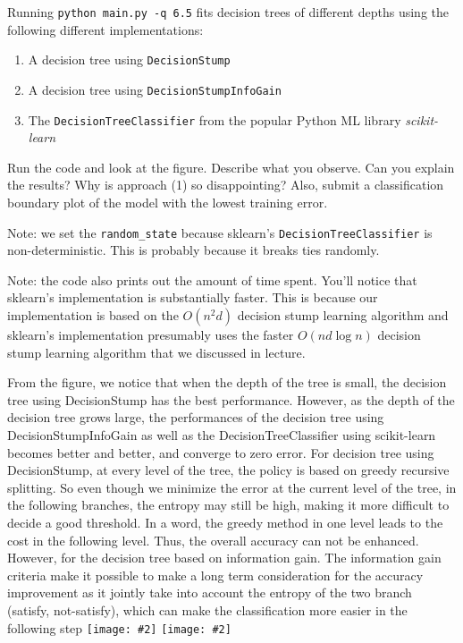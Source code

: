 \documentclass{article}
\def\blu#1{{\color{blu}#1}}
\def\red#1{{\color{red}#1}}
\newcommand{\fig}[2]{\texttt{[image: \#2]}}
\def\enum#1{\begin{enumerate}#1\end{enumerate}}
\begin{document}
Running \texttt{python main.py -q 6.5} fits decision trees of different depths using the following different implementations:
\enum{
\item A decision tree using \texttt{DecisionStump}
\item A decision tree using \texttt{DecisionStumpInfoGain}
\item The \texttt{DecisionTreeClassifier} from the popular Python ML library \emph{scikit-learn}
}

Run the code and look at the figure.
\blu{Describe what you observe. Can you explain the results?} Why is approach (1) so disappointing? Also, \blu{submit a classification boundary plot of the model with the lowest training error}.

Note: we set the \verb|random_state| because sklearn's \texttt{DecisionTreeClassifier} is non-deterministic. This is probably
because it breaks ties randomly.

Note: the code also prints out the amount of time spent. You'll notice that sklearn's implementation is substantially faster. This is because
our implementation is based on the $O(n^2d)$ decision stump learning algorithm and sklearn's implementation presumably uses the faster $O(nd\log n)$
decision stump learning algorithm that we discussed in lecture.

\red{
From the figure, we notice that when the depth of the tree is small, the decision tree using DecisionStump has the best performance.
However, as the depth of the decision tree grows large, the performances of the decision tree using DecisionStumpInfoGain as well as the DecisionTreeClassifier using scikit-learn becomes better and better, and converge to zero error.
For decision tree using DecisionStump, at every level of the tree, the policy is based on greedy recursive splitting.
So even though we minimize the error at the current level of the tree, in the following branches, the entropy may still be high, making it more difficult to decide a good threshold.
In a word, the greedy method in one level leads to the cost in the following level. Thus, the overall accuracy can not be enhanced.
However, for the decision tree based on information gain.
The information gain criteria make it possible to make a long term consideration for the accuracy improvement as it jointly take into account the entropy of the two branch (satisfy, not-satisfy), which can make the classification more easier in the following step
}
\fig{1}{../figs/q6_5_tree_errors}
\fig{1}{../figs/q6_5_decisionBoundary}
\end{document}
